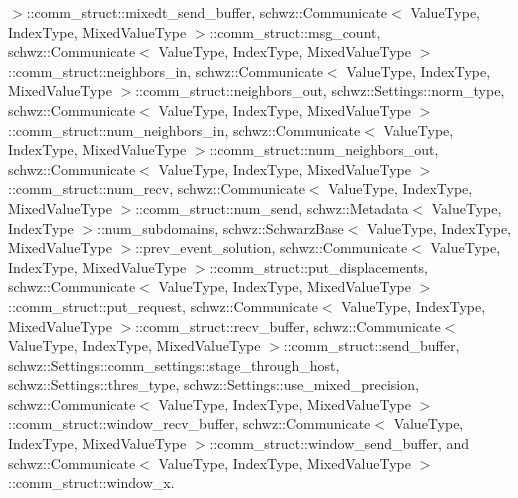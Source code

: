 $>$\+::comm\+\_\+struct\+::mixedt\+\_\+send\+\_\+buffer, schwz\+::\+Communicate$<$ Value\+Type, Index\+Type, Mixed\+Value\+Type $>$\+::comm\+\_\+struct\+::msg\+\_\+count, schwz\+::\+Communicate$<$ Value\+Type, Index\+Type, Mixed\+Value\+Type $>$\+::comm\+\_\+struct\+::neighbors\+\_\+in, schwz\+::\+Communicate$<$ Value\+Type, Index\+Type, Mixed\+Value\+Type $>$\+::comm\+\_\+struct\+::neighbors\+\_\+out, schwz\+::\+Settings\+::norm\+\_\+type, schwz\+::\+Communicate$<$ Value\+Type, Index\+Type, Mixed\+Value\+Type $>$\+::comm\+\_\+struct\+::num\+\_\+neighbors\+\_\+in, schwz\+::\+Communicate$<$ Value\+Type, Index\+Type, Mixed\+Value\+Type $>$\+::comm\+\_\+struct\+::num\+\_\+neighbors\+\_\+out, schwz\+::\+Communicate$<$ Value\+Type, Index\+Type, Mixed\+Value\+Type $>$\+::comm\+\_\+struct\+::num\+\_\+recv, schwz\+::\+Communicate$<$ Value\+Type, Index\+Type, Mixed\+Value\+Type $>$\+::comm\+\_\+struct\+::num\+\_\+send, schwz\+::\+Metadata$<$ Value\+Type, Index\+Type $>$\+::num\+\_\+subdomains, schwz\+::\+Schwarz\+Base$<$ Value\+Type, Index\+Type, Mixed\+Value\+Type $>$\+::prev\+\_\+event\+\_\+solution, schwz\+::\+Communicate$<$ Value\+Type, Index\+Type, Mixed\+Value\+Type $>$\+::comm\+\_\+struct\+::put\+\_\+displacements, schwz\+::\+Communicate$<$ Value\+Type, Index\+Type, Mixed\+Value\+Type $>$\+::comm\+\_\+struct\+::put\+\_\+request, schwz\+::\+Communicate$<$ Value\+Type, Index\+Type, Mixed\+Value\+Type $>$\+::comm\+\_\+struct\+::recv\+\_\+buffer, schwz\+::\+Communicate$<$ Value\+Type, Index\+Type, Mixed\+Value\+Type $>$\+::comm\+\_\+struct\+::send\+\_\+buffer, schwz\+::\+Settings\+::comm\+\_\+settings\+::stage\+\_\+through\+\_\+host, schwz\+::\+Settings\+::thres\+\_\+type, schwz\+::\+Settings\+::use\+\_\+mixed\+\_\+precision, schwz\+::\+Communicate$<$ Value\+Type, Index\+Type, Mixed\+Value\+Type $>$\+::comm\+\_\+struct\+::window\+\_\+recv\+\_\+buffer, schwz\+::\+Communicate$<$ Value\+Type, Index\+Type, Mixed\+Value\+Type $>$\+::comm\+\_\+struct\+::window\+\_\+send\+\_\+buffer, and schwz\+::\+Communicate$<$ Value\+Type, Index\+Type, Mixed\+Value\+Type $>$\+::comm\+\_\+struct\+::window\+\_\+x.

\mbox{\label{classschwz_1_1SolverRAS_ae0d9bc193a40fb1f27738a2436a3fa36}} 
